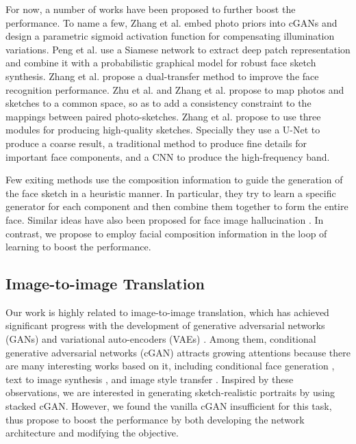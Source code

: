 \documentclass[journal]{IEEEtran}
\begin{document}
For now, a number of works have been proposed to further boost the performance. To name a few, Zhang et al. \cite{Zhang2018IJCAI} embed photo priors into cGANs and design a parametric sigmoid activation function for compensating illumination variations. 
Peng et al. \cite{Peng2019DeepPGM} use a Siamese network to extract deep patch representation and combine it with a probabilistic graphical model for robust face sketch synthesis.
Zhang et al. \cite{Zhang2019TIP} propose a dual-transfer method to improve the face recognition performance. Zhu et al. \cite{Zhu2019ColGAN} and Zhang et al. \cite{Zhang2019MAL} propose to map photos and sketches to a common space, so as to add a consistency constraint to the mappings between paired photo-sketches. 
Zhang et al. \cite{Zhang2019TCYB} propose to use three modules for producing high-quality sketches. Specially they use a U-Net to produce a coarse result, a traditional method to produce fine details for important face components, and a CNN to produce the high-frequency band. 


Few exiting methods use the composition information to guide the generation of the face sketch \cite{Zhang2016Content, Zhang2017Compositional} in a heuristic manner. In particular, they try to learn a specific generator for each component and then combine them together to form the entire face. Similar ideas have also been proposed for face image hallucination \cite{Song2017Learning, Huang2017Beyond}. In contrast, we propose to employ facial composition information in the loop of learning to boost the performance.


\subsection{Image-to-image Translation}
\label{sec:cgan}

Our work is highly related to image-to-image translation, which has achieved significant progress with the development of generative adversarial networks (GANs) \cite{Goodfellow2014GAN, Liu2016CoupledGAN} and variational auto-encoders (VAEs) \cite{Makhzani2015VAE}. Among them, conditional generative adversarial networks (cGAN) \cite{Isola2017Pix2Pix} attracts growing attentions because there are many interesting works based on it, including conditional face generation \cite{Kerras2017progressive}, text to image synthesis \cite{Zhang2017StackGAN}, and image style transfer \cite{Chen2017StyleBank}. Inspired by these observations, we are interested in generating sketch-realistic portraits by using stacked cGAN. However, we found the vanilla cGAN  \cite{Isola2017Pix2Pix} insufficient for this task, thus propose to boost the performance by both developing the network architecture and modifying the objective. 
\end{document}
